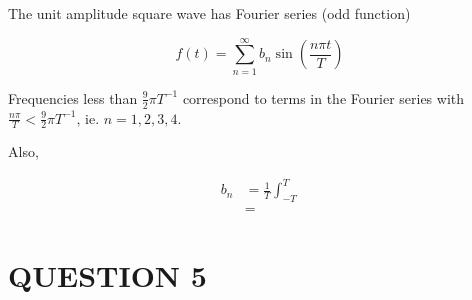 \documentclass[a4paper]{article}
\begin{document}
\begin{enumerate}
	The unit amplitude square wave has Fourier series (odd function)
	
	\[ f(t) = \sum_{n=1}^{\infty}  b_{n} \sin \left(  \frac{n \pi t}{T} \right)  \]
	
	Frequencies less than $ \frac{9}{2} \pi T^{-1} $ correspond to terms in the Fourier series with $ \frac{n \pi}{T} <  \frac{9}{2} \pi T^{-1} $, ie. $ n = 1,2,3,4 $.
	
	Also,
	
	\begin{align*}
	b_{n} & = \frac{1}{T} \int_{-T}^{T} \\
	& = 
	\end{align*}
	
\end{enumerate}



\section{QUESTION 5}
\end{document}
